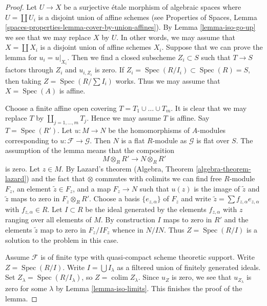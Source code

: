 \documentclass[10pt,a4paper]{amsart}
\theoremstyle{plain}
\theoremstyle{definition}
\theoremstyle{remark}
\numberwithin{equation}{subsection}
\def\colim{\mathop{\mathrm{colim}}\nolimits}
\def\Spec{\mathop{\mathrm{Spec}}}
\begin{document}
\begin{proof}
Let $U \to X$ be a surjective \'etale morphism of algebraic spaces
where $U = \coprod U_i$ is a disjoint union of affine schemes (see
Properties of Spaces, Lemma
\ref{spaces-properties-lemma-cover-by-union-affines}).
By Lemma \ref{lemma-iso-go-up} we see that we may
replace $X$ by $U$. In other words, we may assume that $X = \coprod X_i$
is a disjoint union of affine schemes $X_i$. Suppose that we can prove
the lemma for $u_i = u|_{X_i}$. Then we find a closed subscheme
$Z_i \subset S$ such that $T \to S$ factors through $Z_i$ and
$u_{i, Z_i}$ is zero. If
$Z_i = \Spec(R/I_i) \subset \Spec(R) = S$, then taking
$Z = \Spec(R/\sum I_i)$ works. Thus we may assume that
$X = \Spec(A)$ is affine.

\medskip\noindent
Choose a finite affine open covering $T = T_1 \cup \ldots \cup T_m$.
It is clear that we may replace $T$ by $\coprod_{j = 1, \ldots, m} T_j$.
Hence we may assume $T$ is affine. Say $T = \Spec(R')$.
Let $u : M \to N$ be the homomorphisms of $A$-modules
corresponding to $u : \mathcal{F} \to \mathcal{G}$.
Then $N$ is a flat $R$-module as $\mathcal{G}$ is flat over $S$.
The assumption of the lemma means that the composition
$$
M \otimes_R R' \to N \otimes_R R'
$$
is zero. Let $z \in M$. By Lazard's theorem
(Algebra, Theorem \ref{algebra-theorem-lazard}) and the fact
that $\otimes$ commutes with colimits we can find free $R$-module
$F_z$, an element $\tilde z \in F_z$, and a map $F_z \to N$ such that
$u(z)$ is the image of $\tilde z$ and $\tilde z$ maps to zero in
$F_z \otimes_R R'$. Choose a basis $\{e_{z, \alpha}\}$ of $F_z$ and write
$\tilde z = \sum f_{z, \alpha} e_{z, \alpha}$ with $f_{z, \alpha} \in R$.
Let $I \subset R$ be the ideal generated by the elements $f_{z, \alpha}$
with $z$ ranging over all elements of $M$.
By construction $I$ maps to zero in $R'$ and the elements $\tilde z$
map to zero in $F_z/IF_z$ whence in $N/IN$. Thus $Z = \Spec(R/I)$
is a solution to the problem in this case.

\medskip\noindent
Assume $\mathcal{F}$ is of finite type with quasi-compact scheme
theoretic support. Write $Z = \Spec(R/I)$.
Write $I = \bigcup I_\lambda$ as a filtered union of finitely generated
ideals. Set $Z_\lambda = \Spec(R/I_\lambda)$, so $Z = \colim Z_\lambda$.
Since $u_Z$ is zero, we see that $u_{Z_\lambda}$ is zero
for some $\lambda$ by Lemma \ref{lemma-iso-limits}.
This finishes the proof of the lemma.
\end{proof}
\end{document}

